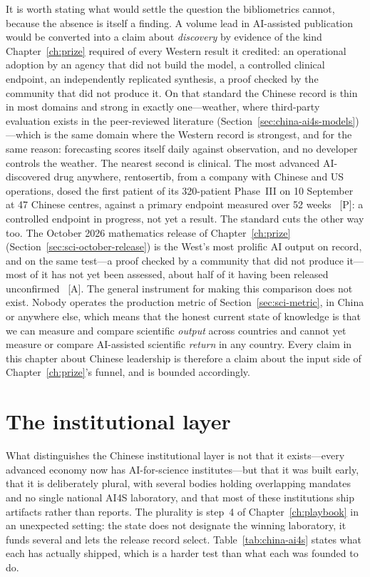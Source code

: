 It is worth stating what would settle the question the bibliometrics cannot, because the absence is itself a finding. A volume lead in AI-assisted publication would be converted into a claim about \emph{discovery} by evidence of the kind Chapter~\ref{ch:prize} required of every Western result it credited: an operational adoption by an agency that did not build the model, a controlled clinical endpoint, an independently replicated synthesis, a proof checked by the community that did not produce it. On that standard the Chinese record is thin in most domains and strong in exactly one---weather, where third-party evaluation exists in the peer-reviewed literature (Section~\ref{sec:china-ai4s-models})---which is the same domain where the Western record is strongest, and for the same reason: forecasting scores itself daily against observation, and no developer controls the weather. The nearest second is clinical. The most advanced AI-discovered drug anywhere, rentosertib, from a company with Chinese and US operations, dosed the first patient of its 320-patient Phase~III on 10 September at 47 Chinese centres, against a primary endpoint measured over 52 weeks~\cite{sci-insilico-dosing} [P]: a controlled endpoint in progress, not yet a result. The standard cuts the other way too. The October 2026 mathematics release of Chapter~\ref{ch:prize} (Section~\ref{sec:sci-october-release}) is the West's most prolific AI output on record, and on the same test---a proof checked by a community that did not produce it---most of it has not yet been assessed, about half of it having been released unconfirmed~\cite{sci-rw-openai} [A]. The general instrument for making this comparison does not exist. Nobody operates the production metric of Section~\ref{sec:sci-metric}, in China or anywhere else, which means that the honest current state of knowledge is that we can measure and compare scientific \emph{output} across countries and cannot yet measure or compare AI-assisted scientific \emph{return} in any country. Every claim in this chapter about Chinese leadership is therefore a claim about the input side of Chapter~\ref{ch:prize}'s funnel, and is bounded accordingly.

\section{The institutional layer}
\label{sec:china-ai4s-institutions}

What distinguishes the Chinese institutional layer is not that it exists---every advanced economy now has AI-for-science institutes---but that it was built early, that it is deliberately plural, with several bodies holding overlapping mandates and no single national AI4S laboratory, and that most of these institutions ship artifacts rather than reports. The plurality is step~4 of Chapter~\ref{ch:playbook} in an unexpected setting: the state does not designate the winning laboratory, it funds several and lets the release record select. Table~\ref{tab:china-ai4s} states what each has actually shipped, which is a harder test than what each was founded to do.

